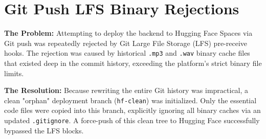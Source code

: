 \section{Git Push LFS Binary Rejections}
\textbf{The Problem:} Attempting to deploy the backend to Hugging Face Spaces via Git push was repeatedly rejected by Git Large File Storage (LFS) pre-receive hooks. The rejection was caused by historical \texttt{.mp3} and \texttt{.wav} binary cache files that existed deep in the commit history, exceeding the platform's strict binary file limits.

\textbf{The Resolution:}
Because rewriting the entire Git history was impractical, a clean "orphan" deployment branch (\texttt{hf-clean}) was initialized. Only the essential code files were copied into this branch, explicitly ignoring all binary caches via an updated \texttt{.gitignore}. A force-push of this clean tree to Hugging Face successfully bypassed the LFS blocks.
